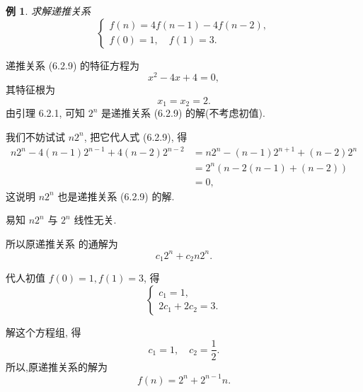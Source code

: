 \documentclass[punct]{ctexbeamer}
\newtheorem{ex}{例}[section]
\def\sol{\noindent {\bf 解\ }}
\begin{document}
\begin{frame}
	\begin{ex}
		求解递推关系
		$$
		\left\{\begin{array}{l}
			f(n)=4 f(n-1)-4 f(n-2), \\
			f(0)=1, \quad f(1)=3 .
		\end{array}\right.
		$$
	\end{ex}
\pause\sol 递推关系 (6.2.9) 的特征方程为$$
x^2-4 x+4=0,
$$
其特征根为
$$x_1=x_2=2.$$
由引理 6.2.1, 可知 $2^n$ 是递推关系 (6.2.9) 的解(不考虑初值).

\pause
我们不妨试试 $n 2^n$, 把它代人式 (6.2.9), 得
$$
\begin{aligned}
	n 2^n-4(n-1) 2^{n-1}+4(n-2) 2^{n-2} &=n 2^n-(n-1) 2^{n+1}+(n-2) 2^n \\
	&=2^n \left(n-2(n-1)+(n-2) \right) \\
	&=0,
\end{aligned}
$$
这说明 $n 2^n$ 也是递推关系 (6.2.9) 的解.
\end{frame}

\begin{frame}
	易知 $n 2^n$ 与 $2^n$ 线性无关.

     所以原递推关系 的通解为
     $$c_1  2^n+ c_2 n 2^n.$$


	代人初值 $f(0)=1, f(1)=3$, 得
	$$
	\left\{\begin{array}{l}
		c_1=1, \\
		2 c_1+2 c_2=3 .
	\end{array}\right.
	$$

	解这个方程组, 得
	$$
	c_1=1, \quad c_2=\frac{1}{2} .
	$$
	所以,原递推关系的解为
	$$
	f(n)=2^n+2^{n-1} n .
	$$
\end{frame}

%
\end{document}
